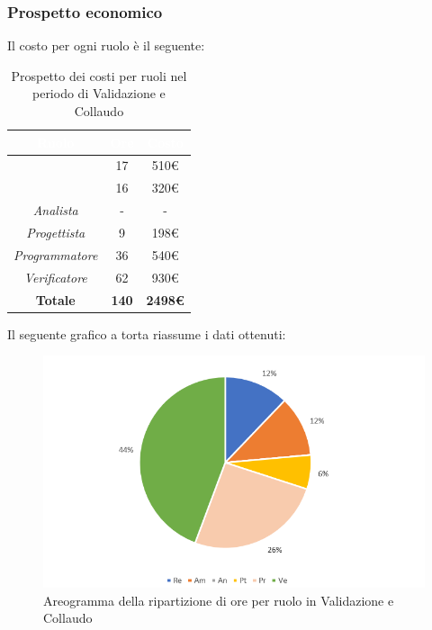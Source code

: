 \subsubsection{Prospetto economico}
Il costo per ogni ruolo è il seguente:
\begin{table}[H]
	\begin{center}
		\begin{tabular}{ |c c c| }
		\rowcolor{darkblue} 
		\textcolor{white}{\textbf{Ruolo}} & \textcolor{white}{\textbf{Ore}} & \textcolor{white}{\textbf{Costo}} \\ \hline
		\textit{\Responsabile} 		& 17 	& 510€ \\ \hline
		\textit{\Amministratore} 	& 16 	& 320€ \\ \hline
		\textit{Analista} 			& - 	& - \\ \hline
		\textit{Progettista} 		& 9 	& 198€ \\ \hline
		\textit{Programmatore}  	& 36 	& 540€ \\ \hline
		\textit{Verificatore} 		& 62 	& 930€ \\ \hline
		\textbf{Totale} & \textbf{140} & \textbf{2498€} \\ \hline
		\end{tabular}
	\caption{ Prospetto dei costi per ruoli nel periodo di Validazione e Collaudo}
	\end{center}
\end{table}
Il seguente grafico a torta riassume i dati ottenuti:
\begin{figure}[H]
    \centering
    \includegraphics[scale = 0.75]{Immagini/ValidazioneTorta.png}
    \caption{Areogramma della ripartizione di ore per ruolo in Validazione e Collaudo}
    \label{fig:Areogramma ripartizione ore, periodo di Validazione e Collaudo}
\end{figure}
\newpage

